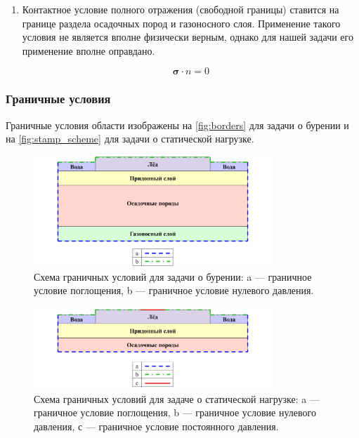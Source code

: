 \begin{enumerate}
    \item Контактное условие полного отражения (свободной границы) ставится на границе раздела осадочных пород и газоносного слоя. Применение такого условия не является вполне физически верным, однако для нашей задачи его применение вполне оправдано.

    \begin{equation}
        \pmb{\sigma} \cdot n = 0
    \end{equation}
\end{enumerate}

\subsubsection{Граничные условия}

Граничные условия области изображены на \autoref{fig:borders} для задачи о бурении и на \autoref{fig:stamp_scheme} для задачи о статической нагрузке.

\begin{figure}[htb]
    \centering
    \includegraphics[width=0.8\textwidth]
    {images/gas_field/border_conds.png}
    \caption{Схема граничных условий для задачи о бурении: a --- граничное условие поглощения, b --- граничное условие нулевого давления.}
    \label{fig:borders}
\end{figure}

\begin{figure}[htb]
    \centering
    \includegraphics[width=0.8\textwidth]
    {images/stamp/stamp_border.png}
    \caption{Схема граничных условий для задаче о статической нагрузке: a --- граничное условие поглощения, b --- граничное условие нулевого давления, с --- граничное условие постоянного  давления.}
    \label{fig:stamp_borders}
\end{figure}

